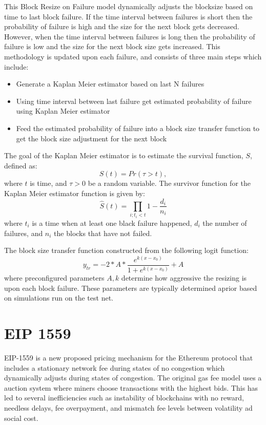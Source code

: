 \documentclass[peerreview]{ieeesyscoin}
\begin{document}
This Block Resize on Failure model dynamically adjusts the blocksize based on time to last block failure. If the time interval between failures is short then the probability of failure is high and the size for the next block gets decreased. However, when the time interval between failures is long then the probability of failure is low and the size for the next block size gets increased. This methodology is updated upon each failure, and consists of three main steps which include:
\begin{itemize}
\item Generate a Kaplan Meier estimator based on last N failures
\item Using time interval between last failure get estimated probability of failure using Kaplan Meier estimator
\item Feed the estimated probability of failure into a block size transfer function to get the block size adjustment for the next block
\end{itemize}

The goal of the Kaplan Meier estimator is to estimate the survival function, $S$, defined as:
\begin{equation}
S(t) = Pr(\tau > t),
\end{equation}
where $t$ is time, and  $\tau > 0$ be a random variable. The survivor function for the Kaplan Meier estimator function is given by:
\begin{equation}
\hat{S}(t) = \prod_{i; t_{i} < t} 1- \frac{d_{i}}{n_{i}}
\end{equation}
where $t_{i}$ is a time when at least one black failure happened, $d_{i}$ the number of failures, and $n_{i}$ the blocks that have not failed. 

The block size transfer function constructed from the following logit function:
\begin{equation}
y_{tr} = -2*A*\frac{e^{k(x-x_{0})}}{1+e^{k(x-x_{0})}} + A
\end{equation}
where preconfigured parameters ${A,k}$  determine how aggressive the resizing is upon each block failure. These parameters are typically determined aprior based on simulations run on the test net. 

\section{EIP 1559}

EIP-1559 is a new proposed pricing mechanism for the Ethereum protocol that includes a stationary network fee during states of no congestion which dynamically adjusts during states of congestion. The original gas fee model uses a auction system where miners choose transactions with the highest bids. This has led to several inefficiencies such as instability of blockchains with no reward, needless delays, fee overpayment, and mismatch fee levels between volatility ad social cost.
\end{document}
